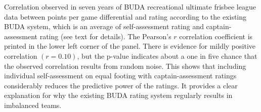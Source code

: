 Correlation observed in seven years of BUDA recreational ultimate frisbee league data between points per game differential and rating according to the existing BUDA system, which is an average of self-assessment rating and captain-assessment rating (see text for details). The Pearson's $r$ correlation coefficient is printed in the lower left corner of the panel. There is evidence for mildly positive correlation $(r = 0.10)$, but the p-value indicates about a one in five chance that the observed correlation results from random noise.  This shows that including individual self-assessment on equal footing with captain-assessment ratings considerably reduces the predictive power of the ratings. It provides a clear explanation for why the existing BUDA rating system regularly results in imbalanced teams. \label{fig:correlation_buda}